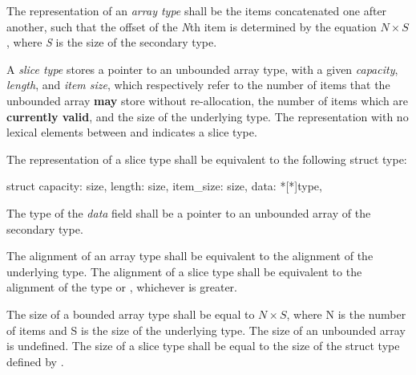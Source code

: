 \specsubsubitem
The representation of an \textit{array type} shall be the items concatenated one
after another, such that the offset of the \textit{N}th item is determined by
the equation $N \times S$, where \textit{S} is the size of the secondary type.

\specsubsubitem
A \textit{slice type} stores a pointer to an unbounded array type, with a given
\textit{capacity}, \textit{length}, and \textit{item size}, which respectively
refer to the number of items that the unbounded array \textbf{may} store without
re-allocation, the number of items which are \textbf{currently valid}, and the
size of the underlying type. The representation with no lexical elements between
\terminal{[} and \terminal{]} indicates a slice type.

\specsubsubitem
The representation of a slice type shall be equivalent to the following struct
type:

\begin{codesample}
struct {
	capacity: size,
	length: size,
	item_size: size,
	data: *[*]type,
}
\end{codesample}

The type of the \textit{data} field shall be a pointer to an unbounded array of
the secondary type.

\specsubsubitem
The alignment of an array type shall be equivalent to the alignment of the
underlying type. The alignment of a slice type shall be equivalent to the
alignment of the  type or , whichever is
greater.

\specsubsubitem
The size of a bounded array type shall be equal to $N \times S$, where N is the
number of items and S is the size of the underlying type. The size of an
unbounded array is undefined. The size of a slice type shall be equal to the
size of the struct type defined by .


\begin{grammar}
 \\
	  \\

 \\
	 \\
	\terminal{(}  \terminal{)}  \\

 \\
	 \optional{\terminal{,}} \\
	 \terminal{,}   \\
	 \terminal{,}  \\

 \\
	 \terminal{:}  \\
	 \\
\end{grammar}


